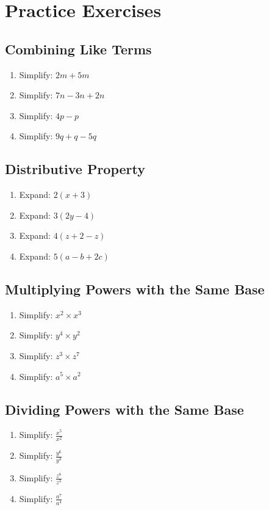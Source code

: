 \documentclass[12pt]{article}
\begin{document}
\section*{Practice Exercises}

\subsection*{Combining Like Terms}
\begin{enumerate}
    \item Simplify: \(2m + 5m\)
    \item Simplify: \(7n - 3n + 2n\)
    \item Simplify: \(4p - p\)
    \item Simplify: \(9q + q - 5q\)
\end{enumerate}

\subsection*{Distributive Property}
\begin{enumerate}
    \item Expand: \(2(x + 3)\)
    \item Expand: \(3(2y - 4)\)
    \item Expand: \(4(z + 2 - z)\)
    \item Expand: \(5(a - b + 2c)\)
\end{enumerate}

\subsection*{Multiplying Powers with the Same Base}
\begin{enumerate}
    \item Simplify: \(x^2 \times x^3\)
    \item Simplify: \(y^4 \times y^2\)
    \item Simplify: \(z^3 \times z^7\)
    \item Simplify: \(a^5 \times a^2\)
\end{enumerate}

\subsection*{Dividing Powers with the Same Base}
\begin{enumerate}
    \item Simplify: \(\frac{x^5}{x^2}\)
    \item Simplify: \(\frac{y^6}{y^3}\)
    \item Simplify: \(\frac{z^8}{z^3}\)
    \item Simplify: \(\frac{a^7}{a^4}\)
\end{enumerate}
\end{document}
